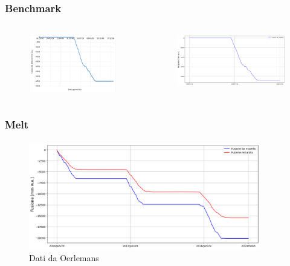 \begin{frame}
    \frametitle{Benchmark}
    \framesubtitle{}

    \begin{columns}
        
        \begin{column}{0.5\textwidth}
            \begin{figure}
                \includegraphics[width=\textwidth]{Immagini/forniLez.png}
            \end{figure}
        \end{column}
        
        \begin{column}{0.5\textwidth}
            \begin{figure}
                \includegraphics[width=\textwidth]{Immagini/forniBen.png}
            \end{figure}
        \end{column}
      \end{columns}
  
\end{frame}


\begin{frame}
    \frametitle{Melt}
    \framesubtitle{}

    \begin{figure}
        \includegraphics[width=0.9\textwidth]{Immagini/confrontoMelt.png}
        \caption{Dati da Oerlemans}
    \end{figure}
  
\end{frame}
